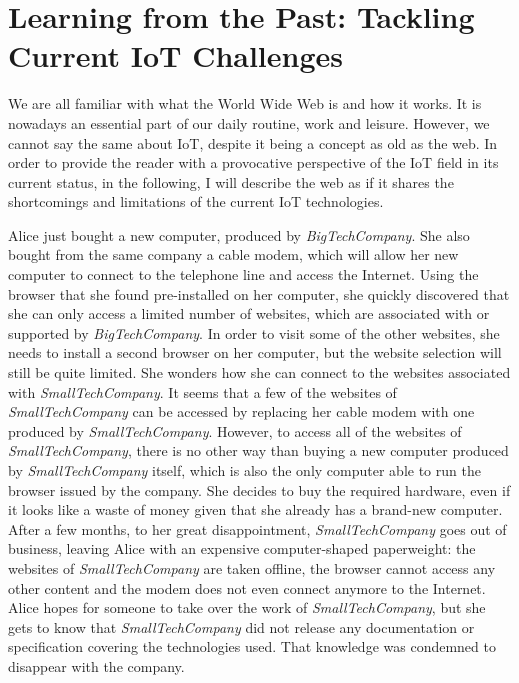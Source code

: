 \pagebreak

\section{Learning from the Past: Tackling Current IoT Challenges}

We are all familiar with what the World Wide Web is and how it works. It is nowadays an essential part of our daily routine, work and leisure. However, we cannot say the same about IoT, despite it being a concept as old as the web. In order to provide the reader with a provocative perspective of the IoT field in its current status, in the following, I will describe the web as if it shares the shortcomings and limitations of the current IoT technologies.

\begin{framed}
Alice just bought a new computer, produced by \textit{BigTechCompany}. She also bought from the same company a cable modem, which will allow her new computer to connect to the telephone line and access the Internet. Using the browser that she found pre-installed on her computer, she quickly discovered that she can only access a limited number of websites, which are associated with or supported by \textit{BigTechCompany}. In order to visit some of the other websites, she needs to install a second browser on her computer, but the website selection will still be quite limited. She wonders how she can connect to the websites associated with \textit{SmallTechCompany}. It seems that a few of the websites of \textit{SmallTechCompany} can be accessed by replacing her cable modem with one produced by \textit{SmallTechCompany}. However, to access all of the websites of \textit{SmallTechCompany}, there is no other way than buying a new computer produced by \textit{SmallTechCompany} itself, which is also the only computer able to run the browser issued by the company.
She decides to buy the required hardware, even if it looks like a waste of money given that she already has a brand-new computer. After a few months, to her great disappointment, \textit{SmallTechCompany} goes out of business, leaving Alice with an expensive computer-shaped paperweight: the websites of \textit{SmallTechCompany} are taken offline, the browser cannot access any other content and the modem does not even connect anymore to the Internet. Alice hopes for someone to take over the work of \textit{SmallTechCompany}, but she gets to know that \textit{SmallTechCompany} did not release any documentation or specification covering the technologies used. That knowledge was condemned to disappear with the company.
\end{framed}

